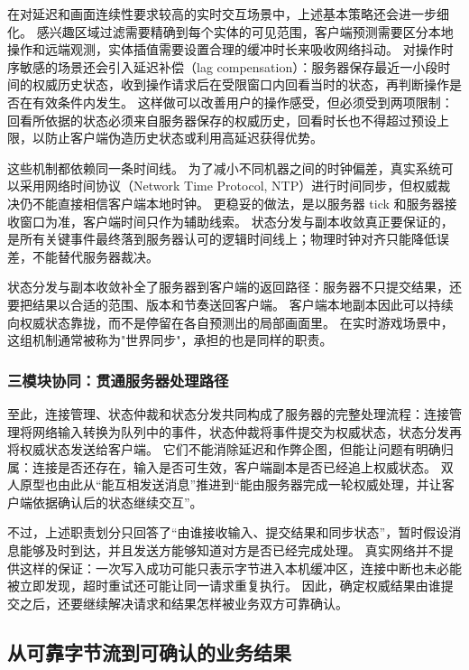 在对延迟和画面连续性要求较高的实时交互场景中，上述基本策略还会进一步细化。
感兴趣区域过滤需要精确到每个实体的可见范围，客户端预测需要区分本地操作和远端观测，实体插值需要设置合理的缓冲时长来吸收网络抖动。
对操作时序敏感的场景还会引入延迟补偿（lag compensation）：服务器保存最近一小段时间的权威历史状态，收到操作请求后在受限窗口内回看当时的状态，再判断操作是否在有效条件内发生。
这样做可以改善用户的操作感受，但必须受到两项限制：回看所依据的状态必须来自服务器保存的权威历史，回看时长也不得超过预设上限，以防止客户端伪造历史状态或利用高延迟获得优势。

这些机制都依赖同一条时间线。
为了减小不同机器之间的时钟偏差，真实系统可以采用网络时间协议（Network Time Protocol, NTP）进行时间同步，但权威裁决仍不能直接相信客户端本地时钟。
更稳妥的做法，是以服务器 tick 和服务器接收窗口为准，客户端时间只作为辅助线索。
状态分发与副本收敛真正要保证的，是所有关键事件最终落到服务器认可的逻辑时间线上；物理时钟对齐只能降低误差，不能替代服务器裁决。

状态分发与副本收敛补全了服务器到客户端的返回路径：服务器不只提交结果，还要把结果以合适的范围、版本和节奏送回客户端。
客户端本地副本因此可以持续向权威状态靠拢，而不是停留在各自预测出的局部画面里。
在实时游戏场景中，这组机制通常被称为"世界同步"，承担的也是同样的职责。

\subsubsection{三模块协同：贯通服务器处理路径}\label{sec2:module-loop}

至此，连接管理、状态仲裁和状态分发共同构成了服务器的完整处理流程：连接管理将网络输入转换为队列中的事件，状态仲裁将事件提交为权威状态，状态分发再将权威状态发送给客户端。
它们不能消除延迟和作弊企图，但能让问题有明确归属：连接是否还存在，输入是否可生效，客户端副本是否已经追上权威状态。
双人原型也由此从“能互相发送消息”推进到“能由服务器完成一轮权威处理，并让客户端依据确认后的状态继续交互”。

不过，上述职责划分只回答了“由谁接收输入、提交结果和同步状态”，暂时假设消息能够及时到达，并且发送方能够知道对方是否已经完成处理。
真实网络并不提供这样的保证：一次写入成功可能只表示字节进入本机缓冲区，连接中断也未必能被立即发现，超时重试还可能让同一请求重复执行。
因此，确定权威结果由谁提交之后，还要继续解决请求和结果怎样被业务双方可靠确认。

\subsection{从可靠字节流到可确认的业务结果}\label{sec2:tcp-robustness}

